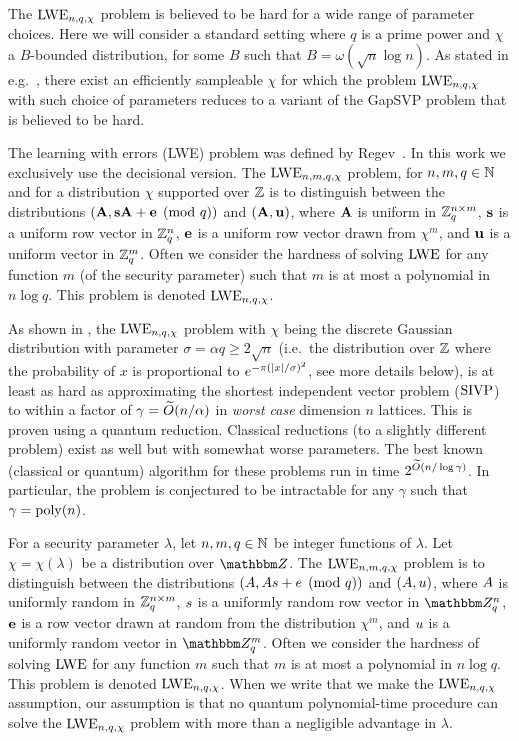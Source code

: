 The $\mathrm{LWE}_{n,q,\chi}$ problem is believed to be hard for a wide range of parameter choices. Here we will consider a standard setting where $q$ is a prime power and $\chi$ a $B$-bounded distribution, for some $B$ such that $B = \omega(\sqrt{n}\log n)$. As stated in e.g.~\cite[Corollary 2.1]{brakerski2012}, there exist an efficiently sampleable $\chi$ for which the problem $\mathrm{LWE}_{n,q,\chi}$ with such choice of parameters reduces to a variant of the GapSVP problem that is believed to be hard. 

The learning with errors (LWE) problem was defined by Regev~\cite{regev2005}. In this work we exclusively use the decisional version. The $\mathrm{LWE}_{n,m,q,\chi}$ problem, for $n,m,q\in\mathbb{N}$ and for a distribution $\chi$ supported over $\mathbb{Z}$ is to distinguish between the distributions $(\mathbf{{A}}, \mathbf{{s}}\mathbf{{A}}+\mathbf{{e}} \pmod{q})$ and $(\mathbf{{A}}, \mathbf{{u}})$, where $\mathbf{{A}}$ is uniform in $\mathbb{Z}_q^{n \times m}$, $\mathbf{{s}}$ is a uniform row vector in $\mathbb{Z}_q^n$, $\mathbf{{e}}$ is a uniform row vector drawn from $\chi^m$, and $\mathbf{{u}}$ is a uniform vector in $\mathbb{Z}_q^m$. Often we consider the hardness of solving $\mathrm{LWE}$ for {any} function $m$ (of the security parameter) such that $m$ is at most a polynomial in $n \log q$. This problem is denoted $\mathrm{LWE}_{n,q,\chi}$.

As shown in \cite{regev2005,PRS17}, the $\mathrm{LWE}_{n,q,\chi}$ problem with $\chi$ being the discrete Gaussian distribution with parameter $\sigma = \alpha q \ge 2 \sqrt{n}$ (i.e.\ the distribution over $\mathbb{Z}$ where the probability of $x$ is proportional to $e^{-\pi (\left\vert {x} \right\vert/\sigma)^2}$, see more details below), is at least as hard as approximating the shortest independent vector problem ($\mathrm{SIVP}$) to within a factor of $\gamma = {\widetilde{O}}({n}/\alpha)$ in \emph{worst case} dimension $n$ lattices. This is proven using a quantum reduction. Classical reductions (to a slightly different problem) exist as well \cite{Peikert09,BLPRS13} but with somewhat worse parameters. The best known (classical or quantum) algorithm for these problems run in time $2^{{\widetilde{O}}(n/\log \gamma)}$. In particular, the problem is conjectured to be intractable for any $\gamma$ such that $\gamma = \operatorname{poly}(n)$.
\fi

\begin{definition}
For a security parameter $\lambda$, let $n,m,q\in \mathbb{N}$ be integer functions of $\lambda$. Let $\chi = \chi(\lambda)$ be a distribution over $\mZ$. The $\mathrm{LWE}_{n,m,q,\chi}$ problem is to distinguish between the distributions $(\*A, \*A\*s + \*e \pmod{q})$ and $(\*A, \*u)$, where $\*A$ is uniformly random in $\mathbb{Z}_q^{n \times m}$, $\*s$ is a uniformly random row vector in $\mZ_q^n$, $\mathbf{{e}}$ is a  row vector drawn at random from the distribution $\chi^m$, and $\*u$ is a uniformly random vector in $\mZ_q^m$. Often we consider the hardness of solving $\mathrm{LWE}$ for {any} function $m$ such that $m$ is at most a polynomial in $n \log q$. This problem is denoted $\mathrm{LWE}_{n,q,\chi}$. When we write that we make the $\mathrm{LWE}_{n,q,\chi}$ assumption, our assumption is that no quantum polynomial-time procedure can solve the $\mathrm{LWE}_{n,q,\chi}$ problem with more than a negligible advantage in $\lambda$. 
\end{definition}



